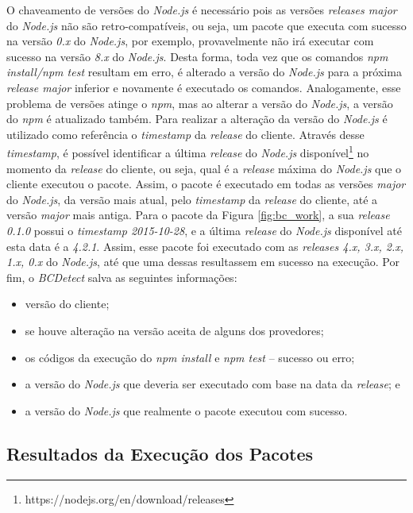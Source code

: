 O chaveamento de versões do \textit{Node.js} é necessário pois as versões \textit{releases major} do \textit{Node.js} não são retro-compatíveis, ou seja, um pacote que executa com sucesso na versão \textit{0.x} do \textit{Node.js}, por exemplo, provavelmente não irá executar com sucesso na versão \textit{8.x} do \textit{Node.js}. Desta forma, toda vez que os comandos \textit{npm install/npm test} resultam em erro, é alterado a versão do \textit{Node.js} para a próxima \textit{release major} inferior e novamente é executado os comandos. Analogamente, esse problema de versões atinge o \textit{npm}, mas ao alterar a versão do \textit{Node.js}, a versão do \textit{npm} é atualizado também. Para realizar a alteração da versão do \textit{Node.js} é utilizado como referência o \textit{timestamp} da \textit{release} do cliente. Através desse \textit{timestamp}, é possível identificar a última \textit{release} do \textit{Node.js} disponível\footnote{https://nodejs.org/en/download/releases} no momento da \textit{release} do cliente, ou seja, qual é a \textit{release} máxima do \textit{Node.js} que o cliente executou o pacote. Assim, o pacote é executado em todas as versões \textit{major} do \textit{Node.js}, da versão mais atual, pelo \textit{timestamp} da \textit{release} do cliente, até a versão \textit{major} mais antiga. Para o pacote da Figura \ref{fig:bc_work}, a sua \textit{release 0.1.0} possui o \textit{timestamp 2015-10-28}, e a última \textit{release} do \textit{Node.js} disponível até esta data é a \textit{4.2.1}. Assim, esse pacote foi executado com as \textit{releases 4.x, 3.x, 2.x, 1.x, 0.x} do \textit{Node.js}, até que uma dessas resultassem em sucesso na execução. Por fim, o \textit{BCDetect} salva as seguintes informações:

\begin{itemize}
    \item versão do cliente;
    \item se houve alteração na versão aceita de alguns dos provedores;
    \item os códigos da execução do \textit{npm install} e \textit{npm test} -- sucesso ou erro;
    \item a versão do \textit{Node.js} que deveria ser executado com base na data da \textit{release}; e
    \item a versão do \textit{Node.js} que realmente o pacote executou com sucesso.
\end{itemize}{}

\subsection{Resultados da Execução dos Pacotes}
\label{sec:col_dados}

